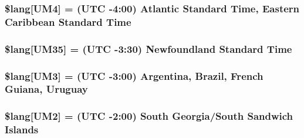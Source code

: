 \subsubsection[{\$lang}]{\setlength{\rightskip}{0pt plus 5cm}\$lang\mbox{[}\textquotesingle{}U\+M4\textquotesingle{}\mbox{]} = \textquotesingle{}(U\+T\+C -\/4\+:00) Atlantic Standard Time, Eastern Caribbean Standard Time\textquotesingle{}}\label{system_2language_2english_2date__lang_8php_a42f66872f4a082bcb2ee004bd2716828}
\hypertarget{system_2language_2english_2date__lang_8php_a389c4a60af83efd29503f60033f3071d}{}
\subsubsection[{\$lang}]{\setlength{\rightskip}{0pt plus 5cm}\$lang\mbox{[}\textquotesingle{}U\+M35\textquotesingle{}\mbox{]} = \textquotesingle{}(U\+T\+C -\/3\+:30) Newfoundland Standard Time\textquotesingle{}}\label{system_2language_2english_2date__lang_8php_a389c4a60af83efd29503f60033f3071d}
\hypertarget{system_2language_2english_2date__lang_8php_abd67512895187d494bbfb18f8d8fee43}{}
\subsubsection[{\$lang}]{\setlength{\rightskip}{0pt plus 5cm}\$lang\mbox{[}\textquotesingle{}U\+M3\textquotesingle{}\mbox{]} = \textquotesingle{}(U\+T\+C -\/3\+:00) Argentina, Brazil, French Guiana, Uruguay\textquotesingle{}}\label{system_2language_2english_2date__lang_8php_abd67512895187d494bbfb18f8d8fee43}
\hypertarget{system_2language_2english_2date__lang_8php_a8ee2f132b462bb709fc3402a592ff573}{}
\subsubsection[{\$lang}]{\setlength{\rightskip}{0pt plus 5cm}\$lang\mbox{[}\textquotesingle{}U\+M2\textquotesingle{}\mbox{]} = \textquotesingle{}(U\+T\+C -\/2\+:00) South Georgia/South Sandwich Islands\textquotesingle{}}\label{system_2language_2english_2date__lang_8php_a8ee2f132b462bb709fc3402a592ff573}
\hypertarget{system_2language_2english_2date__lang_8php_a036e0074236b996b33231b051eda2973}{}
